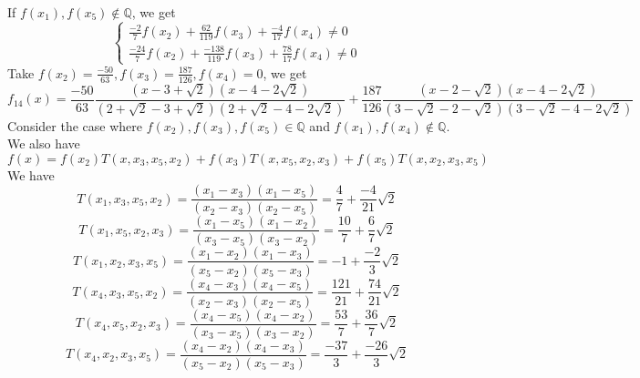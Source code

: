 \documentclass[english, 10pt]{article} %
\begin{document}
If $f(x_1),f(x_5) \not \in \mathbb{Q}$, we get
$$\begin{cases}
\frac{-2}{7}f(x_2)+\frac{62}{119}f(x_3)+\frac{-4}{17}f(x_4) \neq 0\\
\frac{-24}{7}f(x_2)+\frac{-138}{119}f(x_3)+\frac{78}{17}f(x_4) \neq 0
\end{cases}$$
Take $f(x_2)=\frac{-50}{63}, f(x_3)=\frac{187}{126}, f(x_4) = 0$, we get
$$f_{14}(x) = \frac{-50}{63} \frac{(x-3+\sqrt{2})(x-4-2\sqrt{2})}{(2+\sqrt{2}-3+\sqrt{2})(2+\sqrt{2}-4-2\sqrt{2})} + \frac{187}{126} \frac{(x-2-\sqrt{2})(x-4-2\sqrt{2})}{(3-\sqrt{2}-2-\sqrt{2})(3-\sqrt{2}-4-2\sqrt{2})}$$
Consider the case where $f(x_2),f(x_3),f(x_5) \in \mathbb{Q}$ and $f(x_1),f(x_4) \not \in \mathbb{Q}$. We also have
$$f(x) = f(x_2)T(x,x_3,x_5,x_2)+f(x_3)T(x,x_5,x_2,x_3)+f(x_5)T(x,x_2,x_3,x_5)$$
We have
$$T(x_1,x_3,x_5,x_2) = \frac{(x_1-x_3)(x_1-x_5)}{(x_2-x_3)(x_2-x_5)} = \frac{4}{7}+\frac{-4}{21}\sqrt{2}$$
$$T(x_1,x_5,x_2,x_3) = \frac{(x_1-x_5)(x_1-x_2)}{(x_3-x_5)(x_3-x_2)} = \frac{10}{7}+\frac{6}{7}\sqrt{2}$$
$$T(x_1,x_2,x_3,x_5) = \frac{(x_1-x_2)(x_1-x_3)}{(x_5-x_2)(x_5-x_3)}= -1+\frac{-2}{3}\sqrt{2}$$
$$T(x_4,x_3,x_5,x_2) = \frac{(x_4-x_3)(x_4-x_5)}{(x_2-x_3)(x_2-x_5)} = \frac{121}{21}+\frac{74}{21}\sqrt{2}$$
$$T(x_4,x_5,x_2,x_3) = \frac{(x_4-x_5)(x_4-x_2)}{(x_3-x_5)(x_3-x_2)} = \frac{53}{7}+\frac{36}{7}\sqrt{2}$$
$$T(x_4,x_2,x_3,x_5) = \frac{(x_4-x_2)(x_4-x_3)}{(x_5-x_2)(x_5-x_3)}= \frac{-37}{3}+\frac{-26}{3}\sqrt{2}$$
\end{document}
